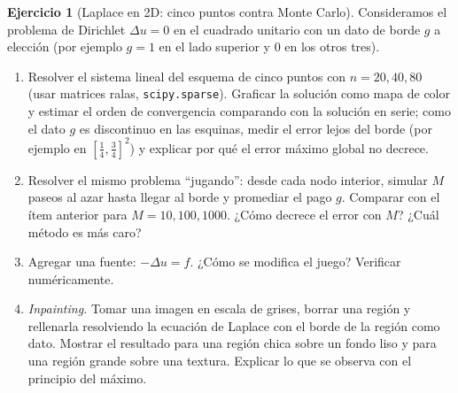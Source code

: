 \documentclass[12pt, a4paper]{amsbook}
\theoremstyle{remark}
\theoremstyle{definition}
\newtheorem{ejer}[teo]{Ejercicio}
\numberwithin{section}{chapter}
\numberwithin{subsection}{section}
\numberwithin{equation}{section}
\numberwithin{figure}{chapter}
\begin{document}
\begin{ejer}[Laplace en 2D: cinco puntos contra Monte Carlo]
Consideramos el problema de Dirichlet $\Delta u = 0$ en el cuadrado unitario con un dato de borde $g$ a elección (por ejemplo $g=1$ en el lado superior y $0$ en los otros tres).
\begin{enumerate}
\item Resolver el sistema lineal del esquema de cinco puntos con $n = 20, 40, 80$ (usar matrices ralas, \lstinline{scipy.sparse}). Graficar la solución como mapa de color y estimar el orden de convergencia comparando con la solución en serie; como el dato $g$ es discontinuo en las esquinas, medir el error lejos del borde (por ejemplo en $[\tfrac14,\tfrac34]^2$) y explicar por qué el error máximo global no decrece.
\item Resolver el mismo problema ``jugando'': desde cada nodo interior, simular $M$ paseos al azar hasta llegar al borde y promediar el pago $g$. Comparar con el ítem anterior para $M=10, 100, 1000$. ¿Cómo decrece el error con $M$? ¿Cuál método es más caro?
\item Agregar una fuente: $-\Delta u = f$. ¿Cómo se modifica el juego? Verificar numéricamente.
\item \emph{Inpainting.} Tomar una imagen en escala de grises, borrar una región y rellenarla resolviendo la ecuación de Laplace con el borde de la región como dato. Mostrar el resultado para una región chica sobre un fondo liso y para una región grande sobre una textura. Explicar lo que se observa con el principio del máximo.
\end{enumerate}
\end{ejer}



\printindex

\end{document}
